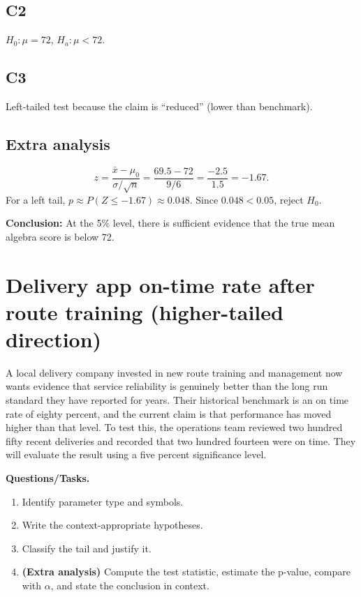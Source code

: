 \subsection*{C2}
\(H_0:\mu=72\), \(H_a:\mu<72\).

\subsection*{C3}
Left-tailed test because the claim is ``reduced'' (lower than benchmark). \LeftTailGraph

\subsection*{Extra analysis}
\[
z=\frac{\bar{x}-\mu_0}{\sigma/\sqrt{n}}=\frac{69.5-72}{9/6}=\frac{-2.5}{1.5}=-1.67.
\]
For a left tail, \(p\approx P(Z\le -1.67)\approx 0.048\). Since \(0.048<0.05\), reject \(H_0\).

\textbf{Conclusion:} At the 5\% level, there is sufficient evidence that the true mean algebra score is below 72.


\section{Delivery app on-time rate after route training (higher-tailed direction)}
A local delivery company invested in new route training and management now wants evidence that service reliability is genuinely better than the long run standard they have reported for years. Their historical benchmark is an on time rate of eighty percent, and the current claim is that performance has moved higher than that level. To test this, the operations team reviewed two hundred fifty recent deliveries and recorded that two hundred fourteen were on time. They will evaluate the result using a five percent significance level.

\textbf{Questions/Tasks.}
\begin{enumerate}
    \item[(C1)] Identify parameter type and symbols.
    \item[(C2)] Write the context-appropriate hypotheses.
    \item[(C3)] Classify the tail and justify it.
    \item[(EA)] \textbf{(Extra analysis)} Compute the test statistic, estimate the p-value, compare with \(\alpha\), and state the conclusion in context.
\end{enumerate}

